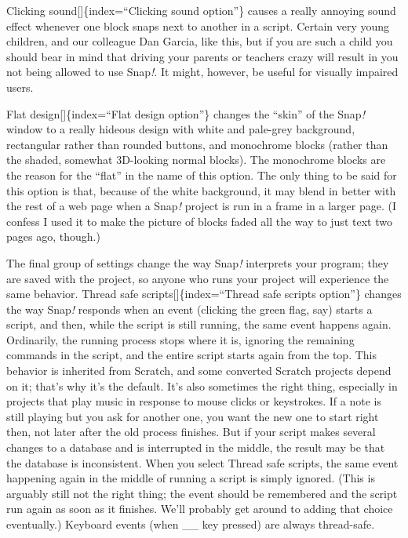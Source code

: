 \documentclass[
  letterpaper,
]{book}
\begin{document}
Clicking sound{[}{]}\{index=``Clicking sound option''\} causes a really
annoying sound effect whenever one block snaps next to another in a
script. Certain very young children, and our colleague Dan Garcia, like
this, but if you are such a child you should bear in mind that driving
your parents or teachers crazy will result in you not being allowed to
use Snap\emph{!}. It might, however, be useful for visually impaired
users.

Flat design{[}{]}\{index=``Flat design option''\} changes the ``skin''
of the Snap\emph{!} window to a really hideous design with white and
pale-grey background, rectangular rather than rounded buttons, and
monochrome blocks (rather than the shaded, somewhat 3D-looking normal
blocks). The monochrome blocks are the reason for the ``flat'' in the
name of this option. The only thing to be said for this option is that,
because of the white background, it may blend in better with the rest of
a web page when a Snap\emph{!} project is run in a frame in a larger
page. (I confess I used it to make the picture of blocks faded all the
way to just text two pages ago, though.)

The final group of settings change the way Snap\emph{!} interprets your
program; they are saved with the project, so anyone who runs your
project will experience the same behavior. Thread safe
scripts{[}{]}\{index=``Thread safe scripts option''\} changes the way
Snap\emph{!} responds when an event (clicking the green flag, say)
starts a script, and then, while the script is still running, the same
event happens again. Ordinarily, the running process stops where it is,
ignoring the remaining commands in the script, and the entire script
starts again from the top. This behavior is inherited from Scratch, and
some converted Scratch projects depend on it; that's why it's the
default. It's also sometimes the right thing, especially in projects
that play music in response to mouse clicks or keystrokes. If a note is
still playing but you ask for another one, you want the new one to start
right then, not later after the old process finishes. But if your script
makes several changes to a database and is interrupted in the middle,
the result may be that the database is inconsistent. When you select
Thread safe scripts, the same event happening again in the middle of
running a script is simply ignored. (This is arguably still not the
right thing; the event should be remembered and the script run again as
soon as it finishes. We'll probably get around to adding that choice
eventually.) Keyboard events (when \_\_ key pressed) are always
thread-safe.
\end{document}
